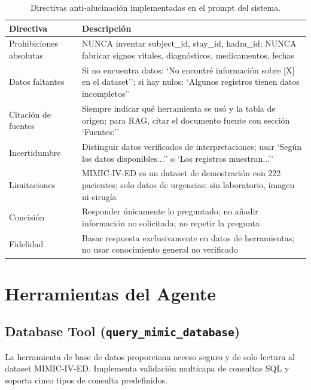 ﻿\documentclass[11pt,a4paper]{article}
\begin{document}
\begin{table}[H]
\centering
\caption{Directivas anti-alucinaci\'on implementadas en el prompt del sistema.}
\label{tab:antihallucination}
\begin{tabularx}{\textwidth}{lX}
\toprule
\textbf{Directiva} & \textbf{Descripci\'on} \\
\midrule
Prohibiciones absolutas & NUNCA inventar subject\_id, stay\_id, hadm\_id; NUNCA fabricar signos vitales, diagn\'osticos, medicamentos, fechas \\
Datos faltantes & Si no encuentra datos: `No encontr\'e informaci\'on sobre [X] en el dataset''; si hay nulos: `Algunos registros tienen datos incompletos'' \\
Citaci\'on de fuentes & Siempre indicar qu\'e herramienta se us\'o y la tabla de origen; para RAG, citar el documento fuente con secci\'on `Fuentes:'' \\
Incertidumbre & Distinguir datos verificados de interpretaciones; usar `Seg\'un los datos disponibles...'' o `Los registros muestran...'' \\
Limitaciones & MIMIC-IV-ED es un dataset de demostraci\'on con 222 pacientes; solo datos de urgencias; sin laboratorio, imagen ni cirug\'ia \\
Concisi\'on & Responder \'unicamente lo preguntado; no a\~nadir informaci\'on no solicitada; no repetir la pregunta \\
Fidelidad & Basar respuesta exclusivamente en datos de herramientas; no usar conocimiento general no verificado \\
\bottomrule
\end{tabularx}
\end{table}

\section{Herramientas del Agente}

\subsection{Database Tool (\texttt{query\_mimic\_database})}

La herramienta de base de datos proporciona acceso seguro y de solo lectura al dataset MIMIC-IV-ED. Implementa validaci\'on multicapa de consultas SQL y soporta cinco tipos de consulta predefinidos.
\end{document}

